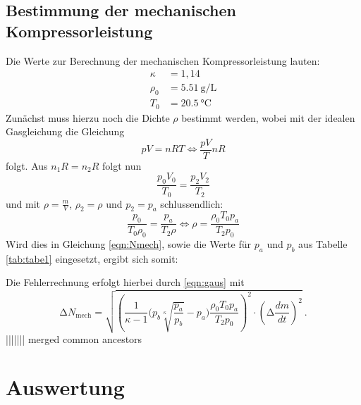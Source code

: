 \subsection{Bestimmung der mechanischen Kompressorleistung}
Die Werte zur Berechnung der mechanischen Kompressorleistung lauten:
\begin{align*}
  \kappa &= 1,14 \\
  \rho_0 &= \SI{5.51}{\gram\per\liter} \\
  T_0 &= \SI{20.5}{\celsius}
\end{align*}
Zunächst muss hierzu noch die Dichte $\rho$ bestimmt werden, wobei mit der idealen Gasgleichung
die Gleichung
\begin{equation}
  pV =nRT \iff \frac{pV}{T}{nR}
\end{equation}
folgt. Aus $n_1R =n_2R$ folgt nun
\begin{equation}
  \frac{p_0 V_0}{T_0} = \frac{p_2 V_2}{T_2}
\end{equation}
und mit $\rho = \frac{m}{V}$, $\rho_2=\rho$ und $p_2 =p_a$ schlussendlich:
\begin{equation}
  \frac{p_0}{T_0\rho_0} = \frac{p_a}{T_2 \rho} \iff \rho = \frac{\rho_0 T_0 p_a}{T_2p_0}
\end{equation}
Wird dies in Gleichung \ref{eqn:Nmech}, sowie die Werte für $p_a$ und $p_b$ aus Tabelle
\ref{tab:tabe1} eingesetzt, ergibt sich somit:

Die Fehlerrechnung erfolgt hierbei durch \ref{eqn:gaus} mit
\begin{equation}
  \increment N_{\text{mech}} = \sqrt{\left(\frac{1}{\kappa-1}\Biggl(p_{b}\sqrt[\kappa]{\frac{p_{a}}{p_{b}}}-p_{a}\Biggr)
  \frac{\rho_0 T_0 p_a}{T_2p_0}\right)^2 \cdot \left(\increment \frac{dm}{dt} \right)^2} \: .
  \label{eqn:f4}
\end{equation}
||||||| merged common ancestors
\section{Auswertung}
\label{sec:Auswertung}
